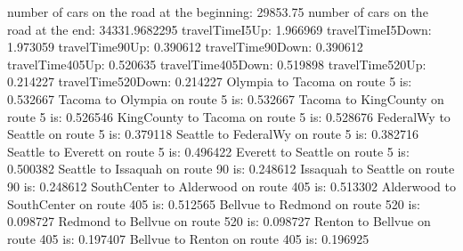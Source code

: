 number of cars on the road at the beginning:
29853.75
number of cars on the road at the end:
34331.9682295
travelTimeI5Up: 1.966969
travelTimeI5Down: 1.973059
travelTime90Up: 0.390612
travelTime90Down: 0.390612
travelTime405Up: 0.520635
travelTime405Down: 0.519898
travelTime520Up: 0.214227
travelTime520Down: 0.214227
Olympia to Tacoma on route 5 is: 0.532667
Tacoma to Olympia on route 5 is: 0.532667
Tacoma to KingCounty on route 5 is: 0.526546
KingCounty to Tacoma on route 5 is: 0.528676
FederalWy to Seattle on route 5 is: 0.379118
Seattle to FederalWy on route 5 is: 0.382716
Seattle to Everett on route 5 is: 0.496422
Everett to Seattle on route 5 is: 0.500382
Seattle to Issaquah on route 90 is: 0.248612
Issaquah to Seattle on route 90 is: 0.248612
SouthCenter to Alderwood on route 405 is: 0.513302
Alderwood to SouthCenter on route 405 is: 0.512565
Bellvue to Redmond on route 520 is: 0.098727
Redmond to Bellvue on route 520 is: 0.098727
Renton to Bellvue on route 405 is: 0.197407
Bellvue to Renton on route 405 is: 0.196925